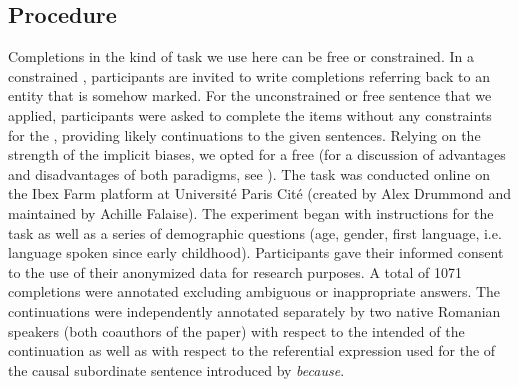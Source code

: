 \documentclass[output=paper,colorlinks,citecolor=brown]{langscibook}
\begin{document}
\subsection {Procedure}

Completions in the kind of task we use here can be free or constrained. In a constrained , participants are invited to write completions referring back to an entity that is somehow marked. For the unconstrained or free sentence  that we applied,  participants were asked to complete the items without any constraints for the , providing likely continuations to the given sentences.  Relying on the strength of the implicit  biases, we opted for a free  (for a discussion of advantages and disadvantages of both paradigms, see \citealt{demberg2023systematic}). The task was conducted online on the Ibex Farm platform at Université Paris Cité (created by Alex Drummond and maintained by Achille Falaise). The experiment began with instructions for the task as well as a series of demographic questions (age, gender, first language, i.e. language spoken since early childhood). Participants gave their informed consent to the use of their anonymized data for research purposes. A total of 1071 completions were annotated excluding ambiguous or inappropriate answers. The continuations were independently annotated separately by two native Romanian speakers (both coauthors of the paper) with respect to the intended  of the continuation as well as with respect to the referential expression used for the  of the causal subordinate sentence introduced by \textit{because}.
\end{document}
